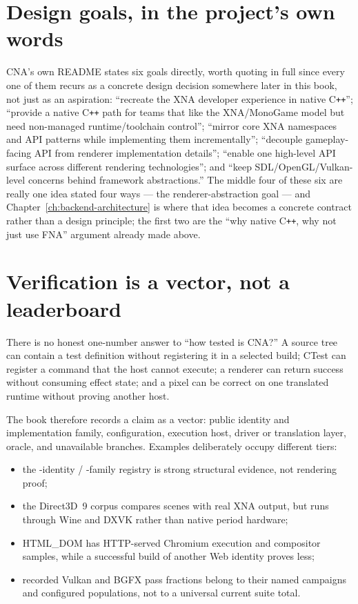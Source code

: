 \section{Design goals, in the project's own words}

CNA's own README states six goals directly, worth quoting in full since every one of them
recurs as a concrete design decision somewhere later in this book, not just as an aspiration:
``recreate the XNA developer experience in native C\texttt{++}''; ``provide a native
C\texttt{++} path for teams that like the XNA/MonoGame model but need non-managed
runtime/toolchain control''; ``mirror core XNA namespaces and API patterns while implementing
them incrementally''; ``decouple gameplay-facing API from renderer implementation
details''; ``enable one high-level API surface across different rendering technologies''; and
``keep SDL/OpenGL/Vulkan-level concerns behind framework abstractions.'' The middle four of
these six are really one idea stated four ways --- the renderer-abstraction goal --- and
Chapter~\ref{ch:backend-architecture} is where that idea becomes a concrete
 contract rather than a design principle; the first two are the
``why native C\texttt{++}, why not just use FNA'' argument already made above.

\section{Verification is a vector, not a leaderboard}

There is no honest one-number answer to ``how tested is CNA?''  A source tree can contain a test
definition without registering it in a selected build; CTest can register a command that the host
cannot execute; a renderer can return success without consuming effect state; and a pixel can be
correct on one translated runtime without proving another host.

The book therefore records a claim as a vector: public identity and implementation family,
configuration, execution host, driver or translation layer, oracle, and unavailable branches.
Examples deliberately occupy different tiers:

\begin{itemize}
  \item the \RendererIdentityCount{}-identity / \RendererFamilyCount{}-family registry is strong structural evidence, not rendering proof;
  \item the Direct3D~9 corpus compares \XnaOracleSceneCount{} scenes with real XNA output, but
        runs through Wine and
        DXVK rather than native period hardware;
  \item HTML\_DOM has HTTP-served Chromium execution and compositor samples, while a successful
        build of another Web identity proves less;
  \item recorded Vulkan and BGFX pass fractions belong to their named campaigns and configured
        populations, not to a universal current suite total.
\end{itemize}

